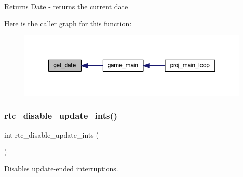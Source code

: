 \begin{DoxyReturn}{Returns}
\mbox{\hyperlink{struct_date}{Date}} -\/ returns the current date 
\end{DoxyReturn}
Here is the caller graph for this function\+:
\nopagebreak
\begin{figure}[H]
\begin{center}
\leavevmode
\includegraphics[width=350pt]{group__rtc_ga1f2c4f317d879fe00426ee4317bc625f_icgraph}
\end{center}
\end{figure}
\mbox{\label{group__rtc_ga6222d2da81f961f574c428db117e610e}} 
\subsubsection{\texorpdfstring{rtc\+\_\+disable\+\_\+update\+\_\+ints()}{rtc\_disable\_update\_ints()}}
{\footnotesize\ttfamily int rtc\+\_\+disable\+\_\+update\+\_\+ints (\begin{DoxyParamCaption}{ }\end{DoxyParamCaption})}



Disables update-\/ended interruptions. 

